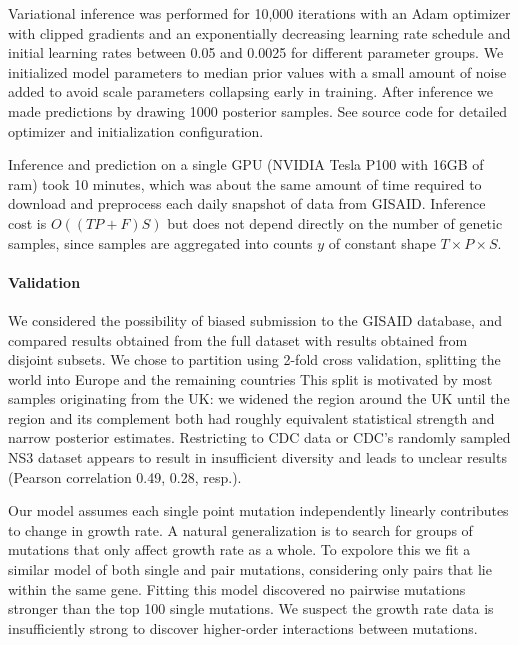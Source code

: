 \documentclass[12pt]{article}
\begin{document}
Variational inference was performed for 10,000 iterations with an Adam optimizer with clipped gradients and an exponentially decreasing learning rate schedule and initial learning rates between 0.05 and 0.0025 for different parameter groups.
We initialized model parameters to median prior values with a small amount of noise added to avoid scale parameters collapsing early in training.
After inference we made predictions by drawing 1000 posterior samples.
See source code for detailed optimizer and initialization configuration.

Inference and prediction on a single GPU (NVIDIA Tesla P100 with 16GB of ram) took 10 minutes, which was about the same amount of time required to download and preprocess each daily snapshot of data from GISAID.
Inference cost is $O((TP+F)S)$ but does not depend directly on the number of genetic samples, since samples are aggregated into counts $y$ of constant shape $T\times P\times S$.

\paragraph*{Validation}

We considered the possibility of biased submission to the GISAID database, and compared results obtained from the full dataset with results obtained from disjoint subsets.
We chose to partition using 2-fold cross validation, splitting the world into Europe and the remaining countries
This split is motivated by most samples originating from the UK: we widened the region around the UK until the region and its complement both had roughly equivalent statistical strength and narrow posterior estimates.
Restricting to CDC data or CDC's randomly sampled NS3 dataset appears to result in insufficient diversity and leads to unclear results (Pearson correlation 0.49, 0.28, resp.).

Our model assumes each single point mutation independently linearly contributes to change in growth rate.
A natural generalization is to search for groups of mutations that only affect growth rate as a whole.
To expolore this we fit a similar model of both single and pair mutations, considering only pairs that lie within the same gene.
Fitting this model discovered no pairwise mutations stronger than the top 100 single mutations.
We suspect the growth rate data is insufficiently strong to discover higher-order interactions between mutations.




\end{document}
